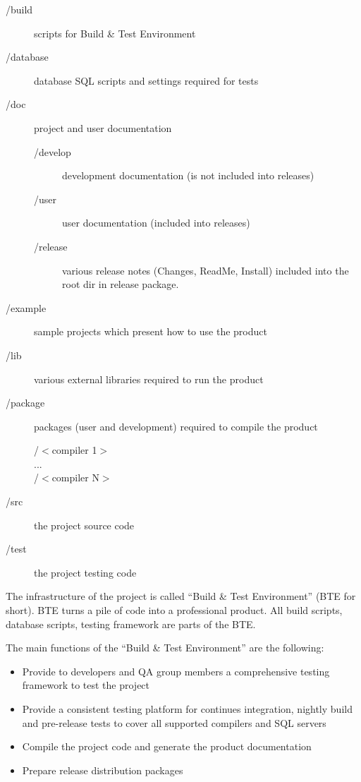 \documentclass[a4paper,12pt,oneside]{book}
\begin{document}
\begin{description}
  \item [/build] scripts for Build \& Test Environment
  \item [/database] database SQL scripts and settings required for tests
  \item [/doc] project and user documentation
    \begin{description}
      \item [/develop] development documentation (is not included into releases)
      \item [/user] user documentation (included into releases)
      \item [/release] various release notes (Changes, ReadMe, Install) included into the root dir in release package.
		\end{description}
	\item [/example] sample projects which present how to use the product
  \item [/lib] various external libraries required to run the product
  \item [/package] packages (user and development) required to compile the product
    \begin{description}
		  \item [/$<$compiler 1$>$]
      \item [...]
      \item [/$<$compiler N$>$]
		\end{description}
	\item [/src] the project source code
	\item [/test] the project testing code
\end{description}

The infrastructure of the project is called “Build \& Test Environment” (BTE for short).
BTE turns a pile of code into a professional product.
All build scripts, database scripts, testing framework are parts of the BTE.

The main functions of the “Build \& Test Environment” are the following:
\begin{itemize}
  \item Provide to developers and QA group members a comprehensive testing framework to test the project
	\item Provide a consistent testing platform for continues integration, nightly build and pre-release tests to cover all supported compilers and SQL servers
	\item Compile the project code and generate the product documentation
	\item Prepare release distribution packages
\end{itemize}
\end{document}

